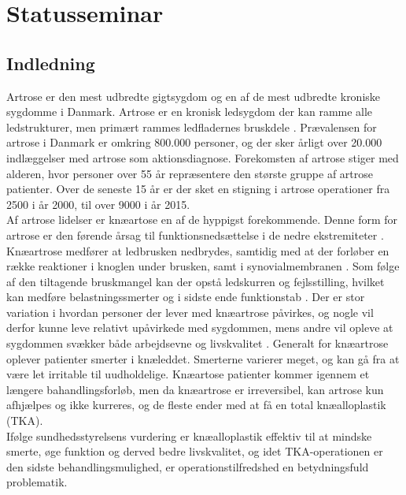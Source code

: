 
\raggedbottom



\chapter{Statusseminar}



\section{Indledning}
Artrose er den mest udbredte gigtsygdom og en af de mest udbredte kroniske sygdomme i Danmark. 
Artrose er en kronisk ledsygdom der kan ramme alle ledstrukturer, men primært rammes ledfladernes bruskdele \cite{schroder}. Prævalensen for artrose i Danmark er omkring 800.000 personer, og der sker årligt over 20.000 indlæggelser med artrose som aktionsdiagnose. \citep{sygdom}
Forekomsten af artrose stiger med alderen, hvor personer over 55 år repræsentere den største gruppe af artrose patienter. Over de seneste 15 år er der sket en stigning i artrose operationer fra 2500 i år 2000, til over 9000 i år 2015. \citep{aarsrapport2016} \\
Af artrose lidelser er knæartose en af de hyppigst forekommende. Denne form for artrose er den førende årsag til funktionsnedsættelse i de nedre ekstremiteter \citep{bezwick2012}. 
Knæartrose medfører at ledbrusken nedbrydes, samtidig med at der forløber en række reaktioner i knoglen under brusken, samt i synovialmembranen \citep{brostrom2012}. Som følge af den tiltagende bruskmangel kan der opstå ledskurren og fejlsstilling, hvilket kan medføre belastningssmerter og i sidste ende funktionstab \citep{ugeskrift2011}.
Der er stor variation i hvordan personer der lever med knæartrose påvirkes, og nogle vil derfor kunne leve relativt upåvirkede med sygdommen, mens andre vil opleve at sygdommen svækker både arbejdsevne og livskvalitet \citep{sygdom}.
Generalt for knæartrose oplever patienter smerter i knæleddet. Smerterne varierer meget, og kan gå fra at være let irritable til uudholdelige. Knæartose patienter kommer igennem et længere bahandlingsforløb, men da knæartrose er irreversibel, kan artrose kun afhjælpes og ikke kurreres, og de fleste ender med at få en total knæalloplastik (TKA).\\ 
Ifølge sundhedsstyrelsens vurdering er knæalloplastik effektiv til at mindske smerte, øge funktion og derved bedre livskvalitet, og idet TKA-operationen er den sidste behandlingsmulighed, er operationstilfredshed en betydningsfuld problematik. %
